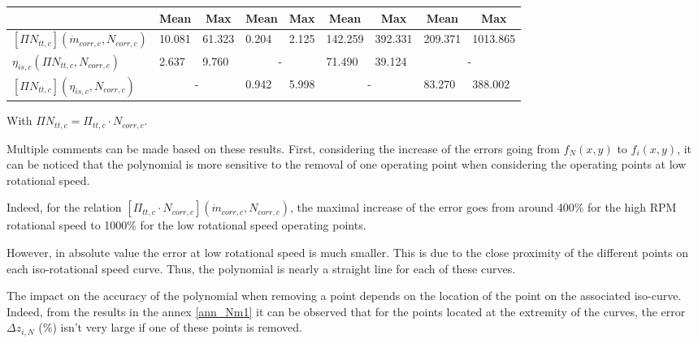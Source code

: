 \begin{longtable}[c]{@{}lclcl|clcl@{}}
\multicolumn{1}{c}{}                          & Mean                       & \multicolumn{1}{c}{Max} & Mean                      & \multicolumn{1}{c|}{Max} & Mean                        & \multicolumn{1}{c}{Max} & Mean                        & \multicolumn{1}{c}{Max} \\* \midrule
$[\Pi N_{tt,c}](\dot{m}_{corr,c},N_{corr,c})$ & \multicolumn{1}{l}{10.081} & 61.323                  & \multicolumn{1}{l}{0.204} & 2.125                    & \multicolumn{1}{l}{142.259} & 392.331                 & \multicolumn{1}{l}{209.371} & 1013.865                \\
$\eta_{is,c}(\Pi N_{tt,c},N_{corr,c})$        & \multicolumn{1}{l}{2.637}  & 9.760                   & \multicolumn{2}{c|}{-}                               & \multicolumn{1}{l}{71.490}  & 39.124                  & \multicolumn{2}{c}{-}                                 \\
$[\Pi N_{tt,c}](\eta_{is,c},N_{corr,c})$      & \multicolumn{2}{c}{-}                                & \multicolumn{1}{l}{0.942} & 5.998                    & \multicolumn{2}{c}{-}                                 & \multicolumn{1}{l}{83.270}  & 388.002                 \\* \bottomrule
\end{longtable}
With $\Pi N_{tt,c} = \Pi_{tt,c}\cdot N_{corr,c}$.

Multiple comments can be made based on these results. First, considering the increase of the errors going from $f_N(x,y)$ to $f_i(x,y)$, it can be noticed that the polynomial is more sensitive to the removal of one operating point when considering the operating points at low rotational speed.

Indeed, for the relation $[\Pi_{tt,c}\cdot N_{corr,c}](\dot{m}_{corr,c},N_{corr,c})$, the maximal increase of the error goes from around 400\% for the high RPM rotational speed to 1000\% for the low rotational speed operating points.

However, in absolute value the error at low rotational speed is much smaller. This is due to the close proximity of the different points on each iso-rotational speed curve. Thus, the polynomial is nearly a straight line for each of these curves. 

The impact on the accuracy of the polynomial when removing a point depends on the location of the point on the associated iso-curve. Indeed, from the results in the annex \ref{ann_Nm1} it can be observed that for the points located at the extremity of the curves, the error $\Delta z_{i,N}$ (\%) isn't very large if one of these points is removed.

